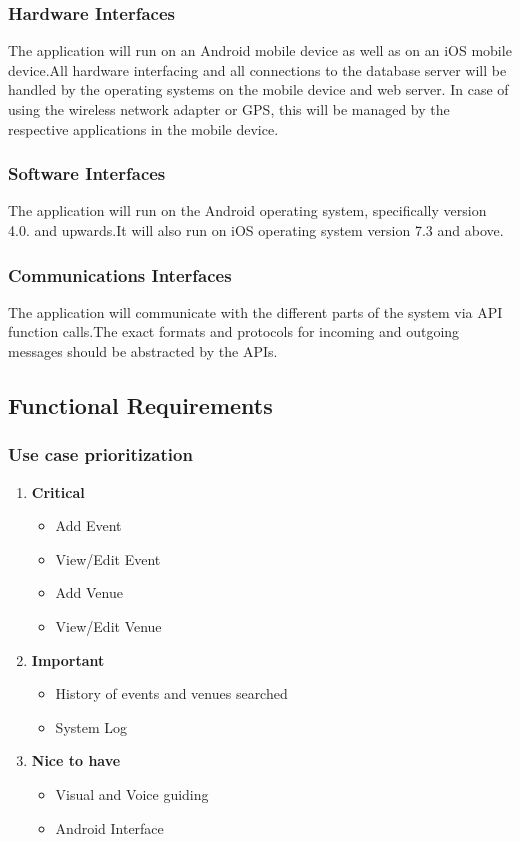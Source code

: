 \documentclass[a4paper,10pt]{article}
\begin{document}
                 \subsubsection{Hardware Interfaces}
The application will run on an Android mobile device as well as on an iOS mobile device.All hardware interfacing and all connections to the database server will be handled by the operating systems on the mobile device and web server. In case of using the wireless network adapter or GPS, this will be managed by the respective applications in the mobile device.

                 \subsubsection{Software Interfaces}
The application will run on the Android operating system, specifically version 4.0. and upwards.It will also run on iOS operating system version 7.3 and above.

                 \subsubsection{Communications Interfaces}
The application will communicate with the different parts of the system via API function calls.The exact formats and protocols for incoming and outgoing messages should be abstracted by the APIs.

	\subsection{Functional Requirements}
	\subsubsection{Use case prioritization} 
		\begin{enumerate} 
		\item \textbf{Critical} 
			\begin{itemize} 
				\item Add Event 
				\item View/Edit Event 
				\item Add Venue 
				\item View/Edit Venue 
			\end{itemize} 
		\item \textbf{Important} 
			\begin{itemize} 
				\item History of events and venues searched 
				\item System Log 
			\end{itemize} 
		\item \textbf{Nice to have} 
			\begin{itemize} 
				\item Visual and Voice guiding 
				\item Android Interface 
			\end{itemize} 
		\end{enumerate} 
\end{document}
